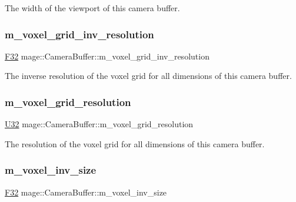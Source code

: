 The width of the viewport of this camera buffer. \hypertarget{structmage_1_1_camera_buffer_a03a9db0d516d3547477da2417ecdc07d}{}\label{structmage_1_1_camera_buffer_a03a9db0d516d3547477da2417ecdc07d} 
\subsubsection{\texorpdfstring{m\+\_\+voxel\+\_\+grid\+\_\+inv\+\_\+resolution}{m\_voxel\_grid\_inv\_resolution}}
{\footnotesize\ttfamily \hyperlink{namespacemage_aa97e833b45f06d60a0a9c4fc22ae02c0}{F32} mage\+::\+Camera\+Buffer\+::m\+\_\+voxel\+\_\+grid\+\_\+inv\+\_\+resolution}

The inverse resolution of the voxel grid for all dimensions of this camera buffer. \hypertarget{structmage_1_1_camera_buffer_a291d49bb4e06ac8986318e365eaf219b}{}\label{structmage_1_1_camera_buffer_a291d49bb4e06ac8986318e365eaf219b} 
\subsubsection{\texorpdfstring{m\+\_\+voxel\+\_\+grid\+\_\+resolution}{m\_voxel\_grid\_resolution}}
{\footnotesize\ttfamily \hyperlink{namespacemage_a41c104c036fba3756a74e19f793eeaa1}{U32} mage\+::\+Camera\+Buffer\+::m\+\_\+voxel\+\_\+grid\+\_\+resolution}

The resolution of the voxel grid for all dimensions of this camera buffer. \hypertarget{structmage_1_1_camera_buffer_a93cc54b7058ff4bc2472572e1547134c}{}\label{structmage_1_1_camera_buffer_a93cc54b7058ff4bc2472572e1547134c} 
\subsubsection{\texorpdfstring{m\+\_\+voxel\+\_\+inv\+\_\+size}{m\_voxel\_inv\_size}}
{\footnotesize\ttfamily \hyperlink{namespacemage_aa97e833b45f06d60a0a9c4fc22ae02c0}{F32} mage\+::\+Camera\+Buffer\+::m\+\_\+voxel\+\_\+inv\+\_\+size}

